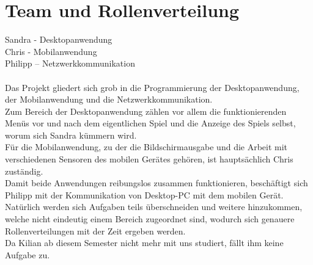 \section{Team und Rollenverteilung}

Sandra - Desktopanwendung \\
Chris - Mobilanwendung \\
Philipp – Netzwerkkommunikation \\
\\
Das Projekt gliedert sich grob in die Programmierung der Desktopanwendung, der Mobilanwendung und die Netzwerkkommunikation. 
\\
Zum Bereich der Desktopanwendung zählen vor allem die funktionierenden Menüs vor und nach dem eigentlichen Spiel und die Anzeige des Spiels selbst, worum sich Sandra kümmern wird.
\\
Für die Mobilanwendung, zu der die Bildschirmausgabe und die Arbeit mit verschiedenen Sensoren des mobilen Gerätes gehören, ist hauptsächlich Chris zuständig.
\\
Damit beide Anwendungen reibungslos zusammen funktionieren, beschäftigt sich Philipp mit der Kommunikation von Desktop-PC mit dem mobilen Gerät.
\\
Natürlich werden sich Aufgaben teils überschneiden und weitere hinzukommen, welche nicht eindeutig einem Bereich zugeordnet sind, wodurch sich genauere Rollenverteilungen mit der Zeit ergeben werden.
\\
Da Kilian ab diesem Semester nicht mehr mit uns studiert, fällt ihm keine Aufgabe zu.

